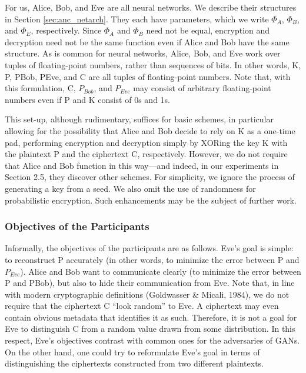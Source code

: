 \documentclass[a4paper]{article}
\begin{document}
    For us, Alice, Bob, and Eve are all neural networks. We describe their structures in Section \ref{sec:anc_netarch}. 
    They each have parameters, which we write $\Phi_{A}$, $\Phi_{B}$, and $\Phi_{E}$, respectively. Since $\Phi_{A}$ and
    $\Phi_{B}$ need not be equal, encryption and decryption need not be the same function even if Alice and
    Bob have the same structure. As is common for neural networks, Alice, Bob, and Eve work over
    tuples of floating-point numbers, rather than sequences of bits. In other words, K, P, PBob, PEve,
    and C are all tuples of floating-point numbers. Note that, with this formulation, C, $P_{Bob}$, and $P_{Eve}$
    may consist of arbitrary floating-point numbers even if P and K consist of 0s and 1s. 
    
    This set-up, although rudimentary, suffices for basic schemes, in particular allowing for the possibility
    that Alice and Bob decide to rely on K as a one-time pad, performing encryption and decryption
    simply by XORing the key K with the plaintext P and the ciphertext C, respectively. However,
    we do not require that Alice and Bob function in this way—and indeed, in our experiments in
    Section 2.5, they discover other schemes. For simplicity, we ignore the process of generating a key
    from a seed. We also omit the use of randomness for probabilistic encryption. 
    Such enhancements may be the subject of further work.

      \subsubsection{Objectives of the Participants}
      Informally, the objectives of the participants are as follows. Eve’s goal is simple: to reconstruct P
      accurately (in other words, to minimize the error between P and $P_{Eve}$). Alice and Bob want to communicate
      clearly (to minimize the error between P and PBob), but also to hide their communication
      from Eve. Note that, in line with modern cryptographic definitions (Goldwasser \& Micali,
      1984), we do not require that the ciphertext C “look random” to Eve. A ciphertext may even contain
      obvious metadata that identifies it as such. Therefore, it is not a goal for Eve to distinguish C
      from a random value drawn from some distribution. In this respect, Eve’s objectives contrast with
      common ones for the adversaries of GANs. On the other hand, one could try to reformulate Eve’s
      goal in terms of distinguishing the ciphertexts constructed from two different plaintexts.
\end{document}
